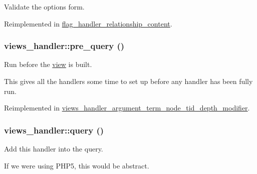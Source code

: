 Validate the options form. 

Reimplemented in \hyperlink{classflag__handler__relationship__content_18742b6cac14664ca2880c9b3bf96feb}{flag\_\-handler\_\-relationship\_\-content}.\hypertarget{classviews__handler_4eeb5551d6c97b1ea074049991989fce}{
\subsubsection[{pre\_\-query}]{\setlength{\rightskip}{0pt plus 5cm}views\_\-handler::pre\_\-query ()}}
\label{classviews__handler_4eeb5551d6c97b1ea074049991989fce}


Run before the \hyperlink{classview}{view} is built.

This gives all the handlers some time to set up before any handler has been fully run. 

Reimplemented in \hyperlink{classviews__handler__argument__term__node__tid__depth__modifier_278abcb2e424241efa1361d01be89eb1}{views\_\-handler\_\-argument\_\-term\_\-node\_\-tid\_\-depth\_\-modifier}.\hypertarget{classviews__handler_91e22c95696d9fdb9ed753a10d42a21d}{
\subsubsection[{query}]{\setlength{\rightskip}{0pt plus 5cm}views\_\-handler::query ()}}
\label{classviews__handler_91e22c95696d9fdb9ed753a10d42a21d}


Add this handler into the query.

If we were using PHP5, this would be abstract. 

